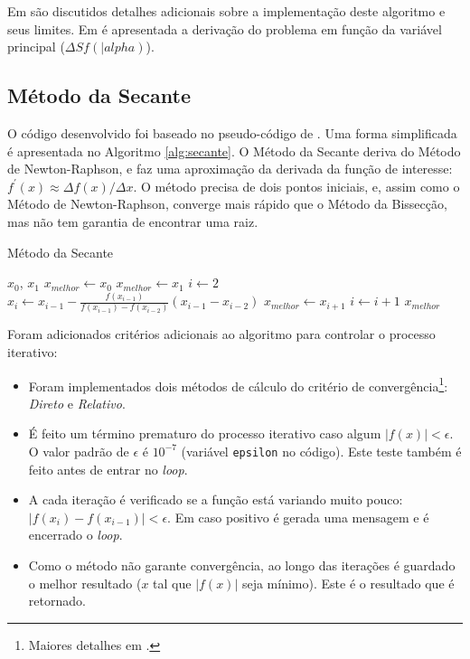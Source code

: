 \documentclass[final,5p]{elsarticle}
\numberwithin{equation}{section}
\begin{document}
Em \cite{relatoriobisseccao} são discutidos detalhes adicionais sobre a implementação deste algoritmo e seus limites. Em \cite{relatorionewtonraphson} é apresentada a derivação do problema em função da variável principal ($\Delta S f(|alpha)$).

    \subsection{Método da Secante}
    
    O código desenvolvido foi baseado no pseudo-código de \cite{burden2016analise}. Uma forma simplificada é apresentada no Algoritmo \ref{alg:secante}. O Método da Secante deriva do Método de Newton-Raphson, e faz uma aproximação da derivada da função de interesse: $f^{\prime}(x) \approx \Delta f(x) / \Delta x$. O método precisa de dois pontos iniciais, e, assim como o Método de Newton-Raphson, converge mais rápido que o Método da Bissecção, mas não tem garantia de encontrar uma raiz. 

    \begin{algorithm}
        \caption{Método da Secante}\label{alg:secante}
        \begin{algorithmic}
            \Require $x_0$, $x_1$
                \State $x_{melhor} \gets x_0$
            \Else
                \State $x_{melhor} \gets x_1$
            \EndIf
            \State $i \gets 2$
            \Repeat
                \State $x_{i} \gets x_{i-1} - \frac{f(x_{i-1})}{f(x_{i-1})-f(x_{i-2})}(x_{i-1}-x_{i-2})$
                    \State $x_{melhor} \gets x_{i+1}$
                \EndIf
                \State $i \gets i+1$
            \State \Return $x_{melhor}$
        \end{algorithmic}
    \end{algorithm}

    Foram adicionados critérios adicionais ao algoritmo para controlar o processo iterativo:

    \begin{itemize}
        \item Foram implementados dois métodos de cálculo do critério de convergência\footnote{Maiores detalhes em \cite{relatoriobisseccao}.}: \emph{Direto} e \emph{Relativo}.
        \item É feito um término prematuro do processo iterativo caso algum $|f(x)| < \epsilon$. O valor padrão de $\epsilon$ é $10^{-7}$ (variável \verb|epsilon| no código). Este teste também é feito antes de entrar no \emph{loop}.
        \item A cada iteração é verificado se a função está variando muito pouco: $|f(x_i)-f(x_{i-1})| < \epsilon$. Em caso positivo é gerada uma mensagem e é encerrado o \emph{loop}.
        \item Como o método não garante convergência, ao longo das iterações é guardado o melhor resultado ($x$ tal que $|f(x)|$ seja mínimo). Este é o resultado que é retornado.
    \end{itemize}
    
\end{document}
